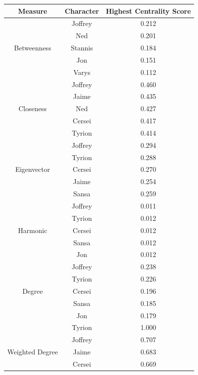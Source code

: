 \documentclass[10pt,twocolumn,letterpaper]{article}
\begin{document}
\begin{table}[!h]
    \centering
    \small
    \begin{tabular}{c|c|c}
        Measure & Character & \small{Highest Centrality Score} \\
        \hline
                    & Joffrey & 0.212 \\
                    & Ned & 0.201 \\
        Betweenness & Stannis & 0.184 \\
                    & Jon & 0.151 \\
                    & Varys & 0.112 \\
        \hline 
                    & Joffrey & 0.460 \\
                    & Jaime & 0.435 \\
        Closeness   & Ned & 0.427 \\
                    & Cersei & 0.417 \\
                    & Tyrion & 0.414 \\
        \hline 
                    & Joffrey & 0.294 \\
                    & Tyrion & 0.288 \\
        Eigenvector & Cersei & 0.270 \\
                    & Jaime & 0.254 \\
                    & Sansa & 0.259 \\
        \hline 
                    & Joffrey & 0.011 \\
                    & Tyrion & 0.012 \\
        Harmonic    & Cersei & 0.012 \\
                    & Sansa & 0.012 \\
                    & Jon & 0.012 \\
        \hline
                    & Joffrey & 0.238 \\
                    & Tyrion & 0.226 \\
        Degree      & Cersei & 0.196 \\
                    & Sansa & 0.185 \\
                    & Jon & 0.179 \\
        \hline
                    & Tyrion & 1.000 \\
                    & Joffrey & 0.707 \\
        Weighted Degree & Jaime & 0.683 \\
                    & Cersei & 0.669 \\

\end{tabular}
\end{table}
\end{document}

